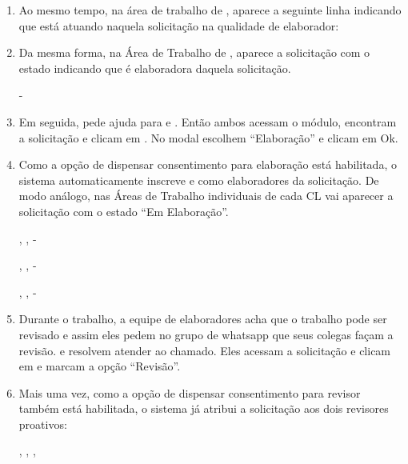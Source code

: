 \begin{landscape}
\begin{enumerate}
	{}{\ET}{-}{Indefinido}
	
	\item Ao mesmo tempo, na área de trabalho de \ET, aparece a seguinte linha indicando que \ET está atuando naquela solicitação na qualidade de elaborador:

	
	\item Da mesma forma, na Área de Trabalho de \ET, aparece a solicitação \SOLD com o estado  indicando que \ET é elaboradora daquela solicitação.

	{}{\ET}{-}{\ET}
	
	\item Em seguida, \ET pede ajuda para \EQ e \EC. Então ambos acessam o módulo, encontram a solicitação \SOLD e clicam em \bInscrever. No modal escolhem ``Elaboração'' e clicam em Ok.
	
	\item Como a opção de dispensar consentimento para elaboração está habilitada, o sistema automaticamente inscreve \EQ e \EC como elaboradores da solicitação. De modo análogo, nas Áreas de Trabalho individuais de cada CL vai aparecer a solicitação com o estado ``Em Elaboração''.

	{}{\ET, \EQ, \EC}{-}{\ET}

	{}{\ET, \EQ, \EC}{-}{\EQ}

	{}{\ET, \EQ, \EC}{-}{\EC}

	
	\item Durante o trabalho, a equipe de elaboradores acha que o trabalho pode ser revisado e assim eles pedem no grupo de whatsapp que seus colegas façam a revisão. \RT e \RQ resolvem atender ao chamado. Eles acessam a solicitação \SOLD e clicam em \bInscrever e marcam a opção ``Revisão''. 
	
	\item Mais uma vez, como a opção de dispensar consentimento para revisor também está habilitada, o sistema já atribui a solicitação aos dois revisores proativos:
	
	{}{\ET, \EQ, \EC}{\RT, \RQ}{\ET}


\end{enumerate}
\end{landscape}
